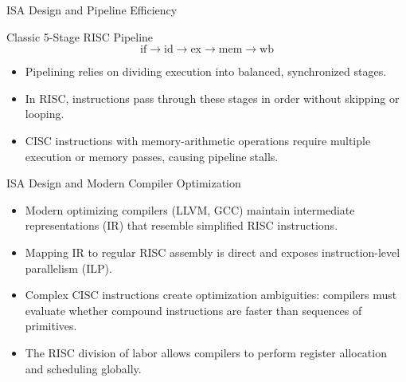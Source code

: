 \documentclass[aspectratio=169,11pt,t]{beamer}
\begin{document}

\begin{frame}{ISA Design and Pipeline Efficiency}
\begin{block}{Classic 5-Stage RISC Pipeline}
$$\boxed{\text{if}} \longrightarrow \boxed{\text{id}} \longrightarrow \boxed{\text{ex}} \longrightarrow \boxed{\text{mem}} \longrightarrow \boxed{\text{wb}}$$
\end{block}

\vspace{0.2cm}
\large
\begin{itemize}\setlength{\itemsep}{7pt}
  \item Pipelining relies on dividing execution into balanced, synchronized stages.
  \item In RISC, instructions pass through these stages in order without skipping or looping.
  \item CISC instructions with memory-arithmetic operations require multiple execution or memory passes, causing pipeline stalls.
\end{itemize}
\end{frame}


\begin{frame}{ISA Design and Modern Compiler Optimization}
\large
\begin{itemize}\setlength{\itemsep}{7pt}
  \item Modern optimizing compilers (LLVM, GCC) maintain intermediate representations (IR) that resemble simplified RISC instructions.
  \item Mapping IR to regular RISC assembly is direct and exposes instruction-level parallelism (ILP).
  \item Complex CISC instructions create optimization ambiguities: compilers must evaluate whether compound instructions are faster than sequences of primitives.
  \item The RISC division of labor allows compilers to perform register allocation and scheduling globally.
\end{itemize}
\end{frame}

\end{document}
